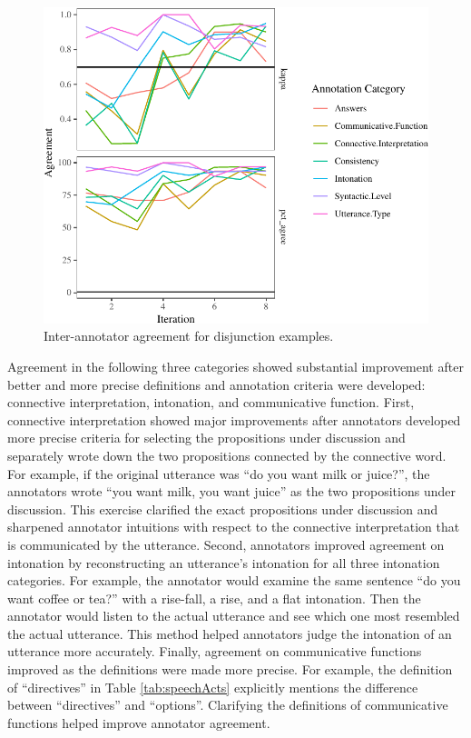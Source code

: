 \documentclass[floatsintext,man]{apa6}
\theoremstyle{definition}
\theoremstyle{definition}
\theoremstyle{definition}
\theoremstyle{remark}
\begin{document}
\begin{figure}[tb]

{\centering \includegraphics{figs/oReliabilityPlot-1} 

}

\caption{Inter-annotator agreement for disjunction examples.}\label{fig:oReliabilityPlot}
\end{figure}

Agreement in the following three categories showed substantial
improvement after better and more precise definitions and annotation
criteria were developed: connective interpretation, intonation, and
communicative function. First, connective interpretation showed major
improvements after annotators developed more precise criteria for
selecting the propositions under discussion and separately wrote down
the two propositions connected by the connective word. For example, if
the original utterance was \enquote{do you want milk or juice?}, the
annotators wrote \enquote{you want milk, you want juice} as the two
propositions under discussion. This exercise clarified the exact
propositions under discussion and sharpened annotator intuitions with
respect to the connective interpretation that is communicated by the
utterance. Second, annotators improved agreement on intonation by
reconstructing an utterance's intonation for all three intonation
categories. For example, the annotator would examine the same sentence
\enquote{do you want coffee or tea?} with a rise-fall, a rise, and a
flat intonation. Then the annotator would listen to the actual utterance
and see which one most resembled the actual utterance. This method
helped annotators judge the intonation of an utterance more accurately.
Finally, agreement on communicative functions improved as the
definitions were made more precise. For example, the definition of
\enquote{directives} in Table \ref{tab:speechActs} explicitly mentions
the difference between \enquote{directives} and \enquote{options}.
Clarifying the definitions of communicative functions helped improve
annotator agreement.
\end{document}

